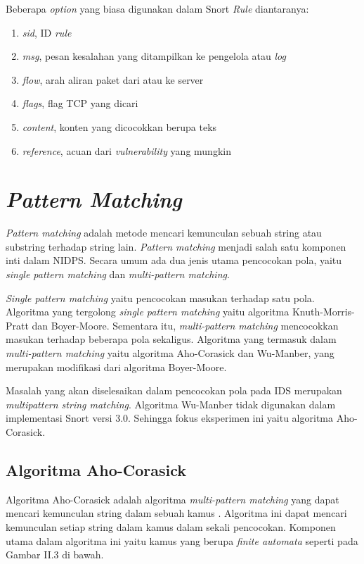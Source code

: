     Beberapa \emph{option} yang biasa digunakan dalam Snort \emph{Rule} diantaranya:
    \begin{enumerate} 
      \item \emph{sid}, ID \emph{rule}
      \item \emph{msg}, pesan kesalahan yang ditampilkan ke pengelola atau \emph{log}
      \item \emph{flow}, arah aliran paket dari atau ke server
      \item \emph{flags}, flag TCP yang dicari
      \item \emph{content}, konten yang dicocokkan berupa teks
      \item \emph{reference}, acuan dari \emph{vulnerability} yang mungkin
    \end{enumerate} 

\section{\emph{Pattern Matching}}

  \emph{Pattern matching} adalah metode mencari kemunculan sebuah string atau substring terhadap string lain. \emph{Pattern matching} menjadi salah satu komponen inti dalam NIDPS. Secara umum ada dua jenis utama pencocokan pola, yaitu \emph{single pattern matching} dan \emph{multi-pattern matching}. 
  
  \emph{Single pattern matching} yaitu pencocokan masukan terhadap satu pola. Algoritma yang tergolong \emph{single pattern matching} yaitu algoritma Knuth-Morris-Pratt dan Boyer-Moore. Sementara itu, \emph{multi-pattern matching} mencocokkan masukan terhadap beberapa pola sekaligus. Algoritma yang termasuk dalam \emph{multi-pattern matching} yaitu algoritma Aho-Corasick dan Wu-Manber, yang merupakan modifikasi dari algoritma Boyer-Moore. 
  
  Masalah yang akan diselesaikan dalam pencocokan pola pada IDS merupakan \emph{multipattern string matching}. Algoritma Wu-Manber tidak digunakan dalam implementasi Snort versi 3.0. Sehingga fokus eksperimen ini yaitu algoritma Aho-Corasick.


  \subsection{Algoritma Aho-Corasick}

    Algoritma Aho-Corasick adalah algoritma \emph{multi-pattern matching} yang dapat mencari kemunculan string dalam sebuah kamus \citep{ahoc1975}. Algoritma ini dapat mencari kemunculan setiap string dalam kamus dalam sekali pencocokan. Komponen utama dalam algoritma ini yaitu kamus yang berupa \emph{finite automata} seperti pada Gambar II.3 di bawah. 

